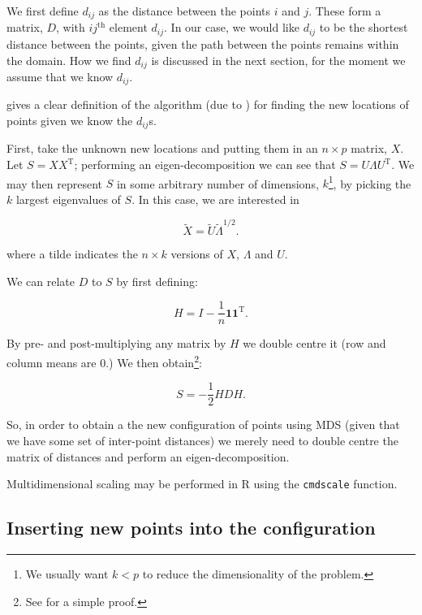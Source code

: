 \documentclass[a4paper,10pt]{amsart}
\newcommand{\tr}[1]{#1^{\text{T}}}
\begin{document}
We first define $d_{ij}$ as the distance between the points $i$ and $j$. These form a matrix, $D$, with $ij^{\text{th}}$ element $d_{ij}$. In our case, we would like $d_{ij}$ to be the shortest distance between the points, given the path between the points remains within the domain. How we find $d_{ij}$ is discussed in the next section, for the moment we assume that we know $d_{ij}$.

\cite{diaconis08} gives a clear definition of the algorithm (due to \cite{schoenberg35}) for finding the new locations of points given we know the $d_{ij}$s. 

First, take the unknown new locations and putting them in an $n \times p$ matrix, $X$. Let $S=X\tr{X}$; performing an eigen-decomposition we can see that $S=U\Lambda\tr{U}$. We may then represent $S$ in some arbitrary number of dimensions, $k$\footnote{We usually want $k<p$ to reduce the dimensionality of the problem.}, by picking the $k$ largest eigenvalues of $S$. In this case, we are interested in

\begin{equation}
\tilde{X}=\tilde{U}\tilde{\Lambda}^{1/2}.
\end{equation}

where a tilde indicates the $n \times k$ versions of $X$, $\Lambda$ and $U$.

We can relate $D$ to $S$ by first defining:

\begin{equation}
H = I-\frac{1}{n}\mathbf{1}\tr{\mathbf{1}}.
\end{equation}

By pre- and post-multiplying any matrix by $H$ we double centre it (row and column means are 0.) We then obtain\footnote{See \cite{diaconis08} for a simple proof.}:

\begin{equation}
S = -\frac{1}{2}HDH.
\end{equation}

So, in order to obtain a the new configuration of points using MDS (given that we have some set of inter-point distances) we merely need to double centre the matrix of distances and perform an eigen-decomposition.

Multidimensional scaling may be performed in \textsf{R} using the \texttt{cmdscale} function. 

\subsection{Inserting new points into the configuration}
\end{document}

